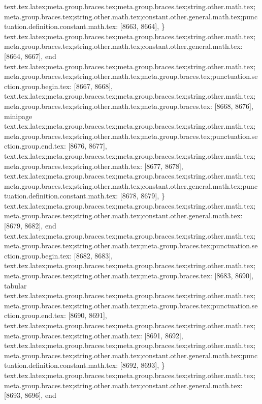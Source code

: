 {{{{{{{{{{{{{{{{{{{{{{{{{{{{{{{{{{{{{{{{{{{{{{{{{{{{{{{{{{{{{{{{{{{{{{{{{{{{{{{{{{{{{{{{{{{{{{{{{{{{{{{{{{{{{{{{{{{{{{{{{{{{{{{{{{{{{{{{{{{{{{{{{{{{{{{{{{{{{{{{{{{{{{{{{{{{{{{{{{{{{{{{{{{{{{{{{{{{{{{{{{{{{{{{{{{{{{{{{{{{{{{{{{{{{{{{{{{{{{{{{{{{{{{{{{{{{{text.tex.latex;meta.group.braces.tex;meta.group.braces.tex;string.other.math.tex;meta.group.braces.tex;string.other.math.tex;constant.other.general.math.tex;punctuation.definition.constant.math.tex: [8663, 8664], {\}
text.tex.latex;meta.group.braces.tex;meta.group.braces.tex;string.other.math.tex;meta.group.braces.tex;string.other.math.tex;constant.other.general.math.tex: [8664, 8667], {end}
text.tex.latex;meta.group.braces.tex;meta.group.braces.tex;string.other.math.tex;meta.group.braces.tex;string.other.math.tex;meta.group.braces.tex;punctuation.section.group.begin.tex: [8667, 8668], {{}
text.tex.latex;meta.group.braces.tex;meta.group.braces.tex;string.other.math.tex;meta.group.braces.tex;string.other.math.tex;meta.group.braces.tex: [8668, 8676], {minipage}
text.tex.latex;meta.group.braces.tex;meta.group.braces.tex;string.other.math.tex;meta.group.braces.tex;string.other.math.tex;meta.group.braces.tex;punctuation.section.group.end.tex: [8676, 8677], {}}
text.tex.latex;meta.group.braces.tex;meta.group.braces.tex;string.other.math.tex;meta.group.braces.tex;string.other.math.tex: [8677, 8678], {
}
text.tex.latex;meta.group.braces.tex;meta.group.braces.tex;string.other.math.tex;meta.group.braces.tex;string.other.math.tex;constant.other.general.math.tex;punctuation.definition.constant.math.tex: [8678, 8679], {\}
text.tex.latex;meta.group.braces.tex;meta.group.braces.tex;string.other.math.tex;meta.group.braces.tex;string.other.math.tex;constant.other.general.math.tex: [8679, 8682], {end}
text.tex.latex;meta.group.braces.tex;meta.group.braces.tex;string.other.math.tex;meta.group.braces.tex;string.other.math.tex;meta.group.braces.tex;punctuation.section.group.begin.tex: [8682, 8683], {{}
text.tex.latex;meta.group.braces.tex;meta.group.braces.tex;string.other.math.tex;meta.group.braces.tex;string.other.math.tex;meta.group.braces.tex: [8683, 8690], {tabular}
text.tex.latex;meta.group.braces.tex;meta.group.braces.tex;string.other.math.tex;meta.group.braces.tex;string.other.math.tex;meta.group.braces.tex;punctuation.section.group.end.tex: [8690, 8691], {}}
text.tex.latex;meta.group.braces.tex;meta.group.braces.tex;string.other.math.tex;meta.group.braces.tex;string.other.math.tex: [8691, 8692], {
}
text.tex.latex;meta.group.braces.tex;meta.group.braces.tex;string.other.math.tex;meta.group.braces.tex;string.other.math.tex;constant.other.general.math.tex;punctuation.definition.constant.math.tex: [8692, 8693], {\}
text.tex.latex;meta.group.braces.tex;meta.group.braces.tex;string.other.math.tex;meta.group.braces.tex;string.other.math.tex;constant.other.general.math.tex: [8693, 8696], {end}
}}}}}}}}}}}}}}}}}}}}}}}}}}}}}}}}}}}}}}}}}}}}}}}}}}}}}}}}}}}}}}}}}}}}}}}}}}}}}}}}}}}}}}}}}}}}}}}}}}}}}}}}}}}}}}}}}}}}}}}}}}}}}}}}}}}}}}}}}}}}}}}}}}}}}}}}}}}}}}}}}}}}}}}}}}}}}}}}}}}}}}}}}}}}}}}}}}}}}}}}}}}}}}}}}}}}}}}}}}}}}}}}}}}}}}}}}}}}}}}}}}}}}}}}}}}}}}}}}
